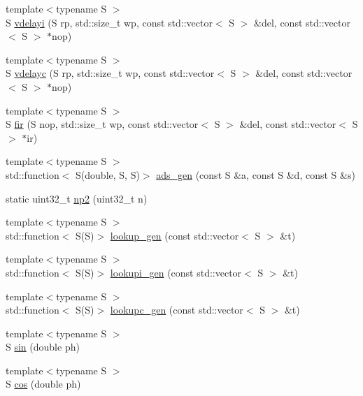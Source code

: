 \begin{DoxyCompactItemize}
\item 
{\footnotesize template$<$typename S $>$ }\\S \hyperlink{namespace_aurora_aa162bda687dbe871e0517cfae199378c}{vdelayi} (S rp, std\+::size\+\_\+t wp, const std\+::vector$<$ S $>$ \&del, const std\+::vector$<$ S $>$ $\ast$nop)
\item 
{\footnotesize template$<$typename S $>$ }\\S \hyperlink{namespace_aurora_a123381990bd6cdcd199852e31a8987c6}{vdelayc} (S rp, std\+::size\+\_\+t wp, const std\+::vector$<$ S $>$ \&del, const std\+::vector$<$ S $>$ $\ast$nop)
\item 
{\footnotesize template$<$typename S $>$ }\\S \hyperlink{namespace_aurora_aa192a550af8daa02ad2ee172339ba0d9}{fir} (S nop, std\+::size\+\_\+t wp, const std\+::vector$<$ S $>$ \&del, const std\+::vector$<$ S $>$ $\ast$ir)
\item 
{\footnotesize template$<$typename S $>$ }\\std\+::function$<$ S(double, S, S)$>$ \hyperlink{namespace_aurora_a966a076f1768216bd9c2d6a07aebf034}{ads\+\_\+gen} (const S \&a, const S \&d, const S \&s)
\item 
static uint32\+\_\+t \hyperlink{namespace_aurora_a49b6f6d92479d80271ced42627154066}{np2} (uint32\+\_\+t n)
\item 
{\footnotesize template$<$typename S $>$ }\\std\+::function$<$ S(S)$>$ \hyperlink{namespace_aurora_ade912bee8dbe0351b2193809ce592d8b}{lookup\+\_\+gen} (const std\+::vector$<$ S $>$ \&t)
\item 
{\footnotesize template$<$typename S $>$ }\\std\+::function$<$ S(S)$>$ \hyperlink{namespace_aurora_a043c55515e053a8d6f31ed7077a1bea6}{lookupi\+\_\+gen} (const std\+::vector$<$ S $>$ \&t)
\item 
{\footnotesize template$<$typename S $>$ }\\std\+::function$<$ S(S)$>$ \hyperlink{namespace_aurora_a3f915a11dad5ebfa5cbd6b2beca3b5f7}{lookupc\+\_\+gen} (const std\+::vector$<$ S $>$ \&t)
\item 
{\footnotesize template$<$typename S $>$ }\\S \hyperlink{namespace_aurora_a388ea5736944d8887f5586afd45a03b8}{sin} (double ph)
\item 
{\footnotesize template$<$typename S $>$ }\\S \hyperlink{namespace_aurora_ab6ef1b966b8f27d107fcabe1027a677a}{cos} (double ph)

\end{DoxyCompactItemize}
